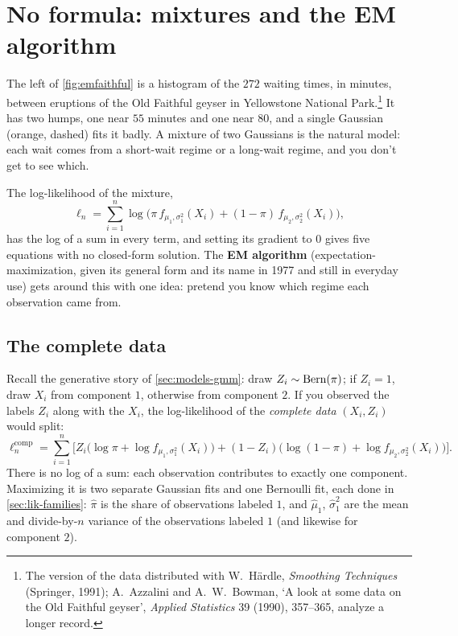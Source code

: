 \section{No formula: mixtures and the EM algorithm}
\label{sec:lik-em}

The left of \cref{fig:emfaithful} is a histogram of the $272$ waiting times, in minutes, between eruptions of the Old Faithful geyser in Yellowstone National Park.\footnote{The version of the data distributed with W.~H\"ardle, \textit{Smoothing Techniques} (Springer, 1991); A.~Azzalini and A.~W.~Bowman, `A look at some data on the Old Faithful geyser', \textit{Applied Statistics} 39 (1990), 357--365, analyze a longer record.}
It has two humps, one near $55$ minutes and one near $80$, and a single Gaussian (orange, dashed) fits it badly.
A mixture of two Gaussians is the natural model: each wait comes from a short-wait regime or a long-wait regime, and you don't get to see which.

The log-likelihood of the mixture,
\[
\ell_n = \sum_{i=1}^n \log\Big( \pi\, f_{\mu_1, \sigma_1^2}(X_i) + (1 - \pi)\, f_{\mu_2, \sigma_2^2}(X_i) \Big),
\]
has the log of a sum in every term, and setting its gradient to $0$ gives five equations with no closed-form solution.
The \textbf{EM algorithm} (expectation-maximization, given its general form and its name in 1977 and still in everyday use) gets around this with one idea: pretend you know which regime each observation came from.

\subsection*{The complete data}

Recall the generative story of \cref{sec:models-gmm}: draw $Z_i \sim \text{Bern}(\pi)$; if $Z_i = 1$, draw $X_i$ from component $1$, otherwise from component $2$.
If you observed the labels $Z_i$ along with the $X_i$, the log-likelihood of the \textit{complete data} $(X_i, Z_i)$ would split:
\[
\ell_n^{\text{comp}} = \sum_{i=1}^n \Big[ Z_i\big(\log\pi + \log f_{\mu_1, \sigma_1^2}(X_i)\big) + (1 - Z_i)\big(\log(1 - \pi) + \log f_{\mu_2, \sigma_2^2}(X_i)\big) \Big].
\]
There is no log of a sum: each observation contributes to exactly one component.
Maximizing it is two separate Gaussian fits and one Bernoulli fit, each done in \cref{sec:lik-families}: $\hat{\pi}$ is the share of observations labeled $1$, and $\hat{\mu}_1$, $\hat{\sigma}_1^2$ are the mean and divide-by-$n$ variance of the observations labeled $1$ (and likewise for component $2$).

